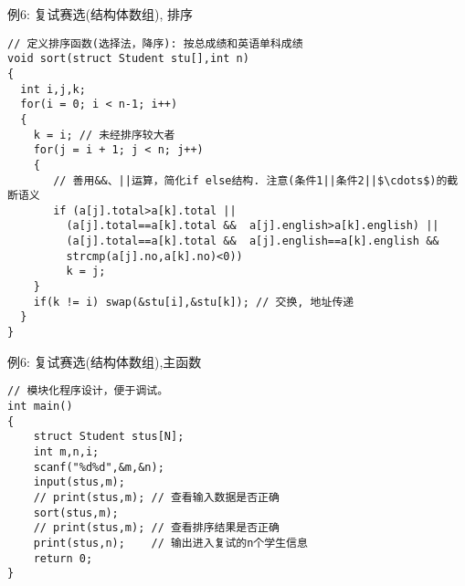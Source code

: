 \begin{frame}{例6: 复试赛选(结构体数组), 排序}
\vspace{-0.5cm}
\begin{lstlisting}
// 定义排序函数(选择法，降序): 按总成绩和英语单科成绩 
void sort(struct Student stu[],int n)            
{
  int i,j,k;
  for(i = 0; i < n-1; i++) 
  {
    k = i; // 未经排序较大者
    for(j = i + 1; j < n; j++)
    {
       // 善用&&、||运算，简化if else结构. 注意(条件1||条件2||$\cdots$)的截断语义
       if (a[j].total>a[k].total || 
         (a[j].total==a[k].total &&  a[j].english>a[k].english) || 
         (a[j].total==a[k].total &&  a[j].english==a[k].english &&
         strcmp(a[j].no,a[k].no)<0))  
         k = j;
    }
    if(k != i) swap(&stu[i],&stu[k]); // 交换, 地址传递
  } 
}
\end{lstlisting}
\end{frame}

\begin{frame}{例6: 复试赛选(结构体数组),主函数}
\vspace{-0.4cm}
\centering
\begin{lstlisting}
// 模块化程序设计，便于调试。
int main()
{
    struct Student stus[N]; 
    int m,n,i;
    scanf("%d%d",&m,&n);
    input(stus,m); 
    // print(stus,m); // 查看输入数据是否正确
    sort(stus,m);
    // print(stus,m); // 查看排序结果是否正确
    print(stus,n);    // 输出进入复试的n个学生信息
    return 0;
}
\end{lstlisting}
\end{frame}

